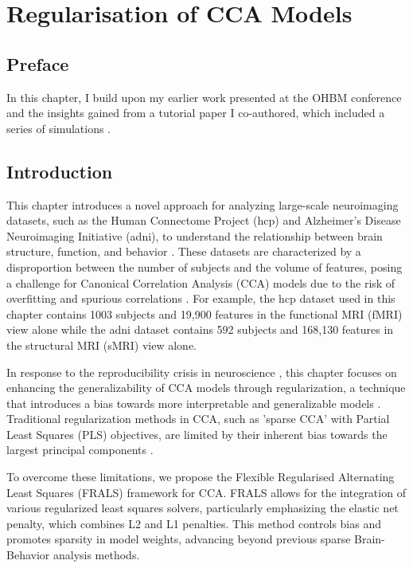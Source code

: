 \graphicspath{{chapters/regularisation}}


\chapter{Regularisation of CCA Models}\label{chap:als}
\minitoc
\section*{Preface}

In this chapter, I build upon my earlier work presented at the OHBM conference and the insights gained from a tutorial paper I co-authored, which included a series of simulations \citep{mihalik2022canonical}.

\section{Introduction}\label{sec:introduction}

This chapter introduces a novel approach for analyzing large-scale neuroimaging datasets, such as the Human Connectome Project (\acrshort{hcp}) and Alzheimer's Disease Neuroimaging Initiative (\acrshort{adni}), to understand the relationship between brain structure, function, and behavior \citep{SMITH2018263,BZDOK2017549,wang2020finding}. These datasets are characterized by a disproportion between the number of subjects and the volume of features, posing a challenge for Canonical Correlation Analysis (CCA) models due to the risk of overfitting and spurious correlations \citep{citation}. For example, the \acrshort{hcp} dataset used in this chapter contains 1003 subjects and 19,900 features in the functional MRI (fMRI) view alone while the \acrshort{adni} dataset contains 592 subjects and  168,130 features in the structural MRI (sMRI) view alone.

In response to the reproducibility crisis in neuroscience \citep{button2013power}, this chapter focuses on enhancing the generalizability of CCA models through regularization, a technique that introduces a bias towards more interpretable and generalizable models \citep{engl1996regularisation,bzdok2019towards}. Traditional regularization methods in CCA, such as 'sparse CCA' with Partial Least Squares (PLS) objectives, are limited by their inherent bias towards the largest principal components \citep{citation}.

To overcome these limitations, we propose the Flexible Regularised Alternating Least Squares (FRALS) framework for CCA. FRALS allows for the integration of various regularized least squares solvers, particularly emphasizing the elastic net penalty, which combines L2 and L1 penalties. This method controls bias and promotes sparsity in model weights, advancing beyond previous sparse Brain-Behavior analysis methods.

